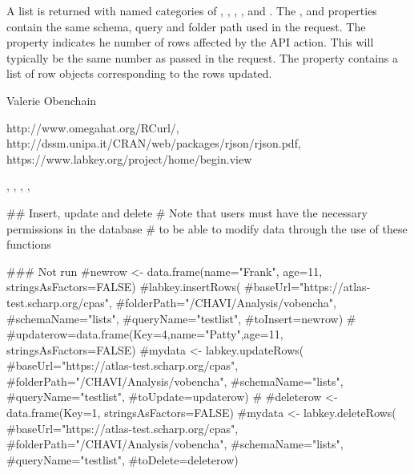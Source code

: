 \documentclass{book}
\begin{document}
\begin{Value}
A list is returned with named categories of , , , ,  and .
The ,  and  properties contain the same schema, query 
and folder path used in the request.  The
 property indicates he number of rows affected by the API action. This will typically be the same
number as passed in the request. The  property contains a list of row objects corresponding to the rows
updated.
\end{Value}
\begin{Author}\relax
Valerie Obenchain
\end{Author}
\begin{References}\relax
http://www.omegahat.org/RCurl/, \\
http://dssm.unipa.it/CRAN/web/packages/rjson/rjson.pdf,\\
https://www.labkey.org/project/home/begin.view
\end{References}
\begin{SeeAlso}\relax
{}, , , 
, 
\end{SeeAlso}
\begin{Examples}
\begin{ExampleCode}
## Insert, update and delete
# Note that users must have the necessary permissions in the database
# to be able to modify data through the use of these functions

### Not run
#newrow <- data.frame(name="Frank", age=11, stringsAsFactors=FALSE)
#labkey.insertRows(
#baseUrl="https://atlas-test.scharp.org/cpas", 
#folderPath="/CHAVI/Analysis/vobencha", 
#schemaName="lists", 
#queryName="testlist", 
#toInsert=newrow)
#
#updaterow=data.frame(Key=4,name="Patty",age=11, stringsAsFactors=FALSE)
#mydata <- labkey.updateRows(
#baseUrl="https://atlas-test.scharp.org/cpas", 
#folderPath="/CHAVI/Analysis/vobencha", 
#schemaName="lists", 
#queryName="testlist", 
#toUpdate=updaterow)
#
#deleterow <- data.frame(Key=1, stringsAsFactors=FALSE)
#mydata <- labkey.deleteRows(
#baseUrl="https://atlas-test.scharp.org/cpas", 
#folderPath="/CHAVI/Analysis/vobencha", 
#schemaName="lists", 
#queryName="testlist", 
#toDelete=deleterow)

\end{ExampleCode}
\end{Examples}
\end{document}
